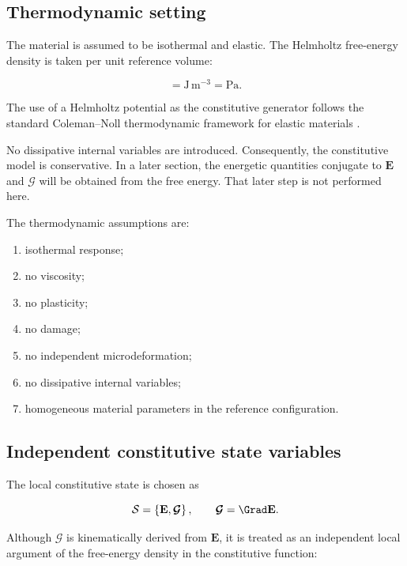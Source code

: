\documentclass[11pt]{article}
\begin{document}
\subsection{Thermodynamic setting}

The material is assumed to be isothermal and elastic. The Helmholtz free-energy density is taken per unit reference volume:

\begin{equation}
[\Psi]=\mathrm{J\,m^{-3}}=\mathrm{Pa}.
\label{eq:sec2_energy_unit}
\end{equation}

The use of a Helmholtz potential as the constitutive generator follows the standard Coleman--Noll thermodynamic framework for elastic materials \cite{ColemanNoll1963,GurtinFriedAnand2010}.

No dissipative internal variables are introduced. Consequently, the constitutive model is conservative. In a later section, the energetic quantities conjugate to $\mathbf{E}$ and $\bm{\mathcal{G}}$ will be obtained from the free energy. That later step is not performed here.

The thermodynamic assumptions are:

\begin{enumerate}
\item isothermal response;
\item no viscosity;
\item no plasticity;
\item no damage;
\item no independent microdeformation;
\item no dissipative internal variables;
\item homogeneous material parameters in the reference configuration.
\end{enumerate}

\subsection{Independent constitutive state variables}

The local constitutive state is chosen as

\begin{equation}
\mathcal{S}
=
\left\{
\mathbf{E},
\bm{\mathcal{G}}
\right\},
\qquad
\bm{\mathcal{G}}=\Grad\mathbf{E}.
\label{eq:sec2_state_set}
\end{equation}

Although $\bm{\mathcal{G}}$ is kinematically derived from $\mathbf{E}$, it is treated as an independent local argument of the free-energy density in the constitutive function:
\end{document}
